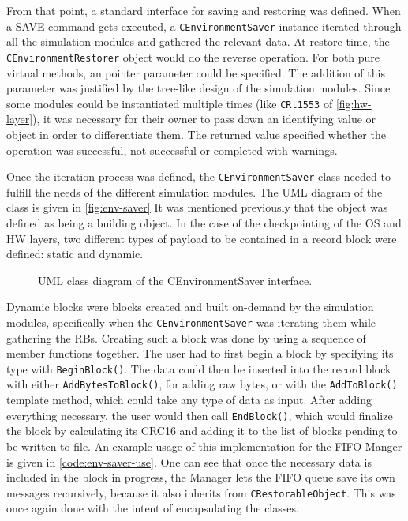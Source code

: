 {From that point, a standard interface for saving and restoring was defined. When a SAVE command gets executed, a \texttt{CEnvironmentSaver} instance iterated through all the simulation modules and gathered the relevant data. At restore time, the \texttt{CEnvironmentRestorer} object would do the reverse operation. For both pure virtual methods, an pointer parameter could be specified. The addition of this parameter was justified by the tree-like design of the simulation modules. Since some modules could be instantiated multiple times (like \texttt{CRt1553} of \autoref{fig:hw-layer}), it was necessary for their owner to pass down an identifying value or object in order to differentiate them. The returned value specified whether the operation was successful, not successful or completed with warnings. 

Once the iteration process was defined, the \texttt{CEnvironmentSaver} class needed to fulfill the needs of the different simulation modules. The UML diagram of the class is given in \autoref{fig:env-saver} It was mentioned previously that the object was defined as being a building object. In the case of the checkpointing of the OS and HW layers, two different types of payload to be contained in a record block were defined: static and dynamic. 

\begin{figure}[htbp]
	\centering
	\vspace{12pt}
	\footnotesize
	
	\caption{UML class diagram of the CEnvironmentSaver interface.}
	\label{fig:env-saver}
\end{figure}


Dynamic blocks were blocks created and built on-demand by the simulation modules, specifically when the \texttt{CEnvironmentSaver} was iterating them while gathering the RBs. Creating such a block was done by using a sequence of member functions together. The user had to first begin a block by specifying its type with \texttt{BeginBlock()}. The data could then be inserted into the record block with either \texttt{AddBytesToBlock()}, for adding raw bytes, or with the \texttt{AddToBlock()} template method, which could take any type of data as input. After adding everything necessary, the user would then call \texttt{EndBlock()}, which would finalize the block by calculating its CRC16 and adding it to the list of blocks pending to be written to file. An example usage of this implementation for the FIFO Manger is given in \autoref{code:env-saver-use}. One can see that once the necessary data is included in the block in progress, the Manager lets the FIFO queue save its own messages recursively, because it also inherits from \texttt{CRestorableObject}. This was once again done with the intent of encapsulating the classes.

}

